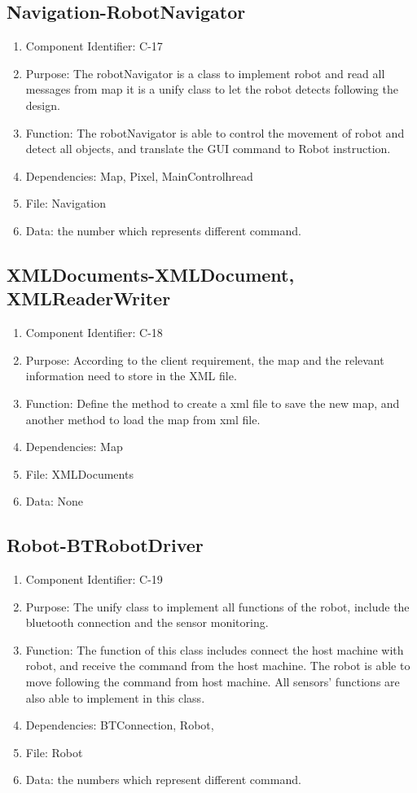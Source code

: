 \documentclass[11pt, a4paper]{report}
\begin{document}
\subsection{Navigation-RobotNavigator}
\begin{enumerate}
\item Component Identifier: C-17
\item Purpose: The robotNavigator is a class to implement robot and read all messages from map it is a unify class to let the robot detects following the design. 
\item Function: The robotNavigator is able to control the movement of robot and detect all objects, and translate the GUI command to Robot instruction.   
\item Dependencies: Map, Pixel, MainControlhread
\item File: Navigation
\item Data: the number which represents different command.
\end{enumerate}

\subsection{XMLDocuments-XMLDocument, XMLReaderWriter}
\begin{enumerate}
\item Component Identifier: C-18
\item Purpose: According to the client requirement, the map and the relevant information need to store in the XML file. 
\item Function: Define the method to create a xml file to save the new map, and another method to load the map from xml file.
\item Dependencies: Map
\item File: XMLDocuments
\item Data: None
\end{enumerate}

\subsection{Robot-BTRobotDriver}
\begin{enumerate}
\item Component Identifier: C-19
\item Purpose: The unify class to implement all functions of the robot, include the bluetooth connection and the sensor monitoring.
\item Function: The function of this class includes connect the host machine with robot, and receive the command from the host machine. The robot is able to move following the command from host machine. All sensors' functions are also able to implement in this class. 
\item Dependencies: BTConnection, Robot,
\item File: Robot
\item Data: the numbers which represent different command.
\end{enumerate}
\end{document}
